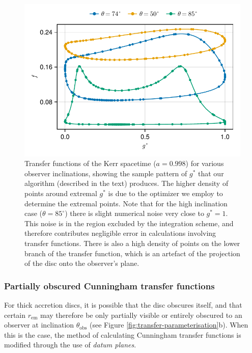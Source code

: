 \documentclass[fleqn,usenatbib]{mnras}
\newcommand{\rhoem}{r_\text{em}}
\begin{document}
\begin{figure}
    \centering
    \includegraphics[width=0.95\linewidth]{figures/transfer-functions.sampling.pdf}
    \caption{Transfer functions of the Kerr spacetime ($a = 0.998$) for various
        observer inclinations, showing the sample pattern of $g^\ast$ that our
        algorithm (described in the text) produces. The higher
        density of points around extremal $g^\ast$ is due to the optimizer we
        employ to determine the extremal points. Note that for the high
        inclination case ($\theta = 85^\circ$) there is slight numerical noise
        very close to $g^\ast = 1$. This noise is in the region excluded by the
        integration scheme, and therefore contributes negligible error in
        calculations involving transfer functions. There is also a high density
        of points on the lower branch of the transfer function, which is an
        artefact of the projection of the disc onto the observer's plane.
    }
    \label{fig:transfer-sampling-pattern}
\end{figure}

\subsubsection{Partially obscured Cunningham transfer functions}
\label{sec:partially-obscured-functions}

For thick accretion discs, it is possible that the disc obscures itself, and
that certain $\rhoem$ may therefore be only partially visible or entirely
obscured to an observer at inclination $\theta_\text{obs}$ (see Figure
\ref{fig:transfer-parameterisation}b). When this is the case, the method of
calculating Cunningham transfer functions is modified through the use of
\emph{datum planes}.
\end{document}
